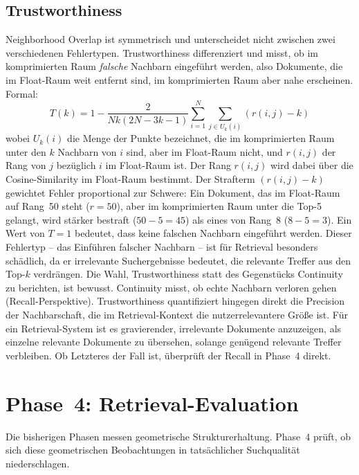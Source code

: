 \subsection{Trustworthiness}
%
Neighborhood Overlap ist symmetrisch und unterscheidet nicht zwischen zwei verschiedenen Fehlertypen.
Trustworthiness \cite{venna_2001_trustworthiness,venna_2006_trustworthiness} differenziert und misst, ob im komprimierten Raum \emph{falsche} Nachbarn eingeführt werden, also Dokumente, die im Float-Raum weit entfernt sind, im komprimierten Raum aber nahe erscheinen.
%
Formal:
\begin{equation}
  T(k) = 1 - \frac{2}{Nk(2N - 3k - 1)} \sum_{i=1}^{N} \sum_{j \in U_k(i)} (r(i,j) - k)
\end{equation}
%
wobei $U_k(i)$ die Menge der Punkte bezeichnet, die im komprimierten Raum unter den $k$ Nachbarn von $i$ sind, aber im Float-Raum nicht, und $r(i,j)$ der Rang von $j$ bezüglich $i$ im Float-Raum ist.
Der Rang $r(i,j)$ wird dabei über die Cosine-Similarity im Float-Raum bestimmt.
%
Der Strafterm $(r(i,j) - k)$ gewichtet Fehler proportional zur Schwere: Ein Dokument, das im Float-Raum auf Rang~50 steht ($r = 50$), aber im komprimierten Raum unter die Top-5 gelangt, wird stärker bestraft ($50 - 5 = 45$) als eines von Rang~8 ($8 - 5 = 3$).
Ein Wert von $T = 1$ bedeutet, dass keine falschen Nachbarn eingeführt werden.
%
Dieser Fehlertyp -- das Einführen falscher Nachbarn -- ist für Retrieval besonders schädlich, da er irrelevante Suchergebnisse bedeutet, die relevante Treffer aus den Top-$k$ verdrängen.
Die Wahl, Trustworthiness statt des Gegenstücks Continuity zu berichten, ist bewusst.
Continuity misst, ob echte Nachbarn verloren gehen (Recall-Perspektive).
Trustworthiness quantifiziert hingegen direkt die Precision der Nachbarschaft, die im Retrieval-Kontext die nutzerrelevantere Größe ist.
Für ein Retrieval-System ist es gravierender, irrelevante Dokumente anzuzeigen, als einzelne relevante Dokumente zu übersehen, solange genügend relevante Treffer verbleiben.
Ob Letzteres der Fall ist, überprüft der Recall in Phase~4 direkt.
%
\section{Phase~4: Retrieval-Evaluation}
\label{sec:methodik_phase4}
%
Die bisherigen Phasen messen geometrische Strukturerhaltung.
Phase~4 prüft, ob sich diese geometrischen Beobachtungen in tatsächlicher Suchqualität niederschlagen.
%
